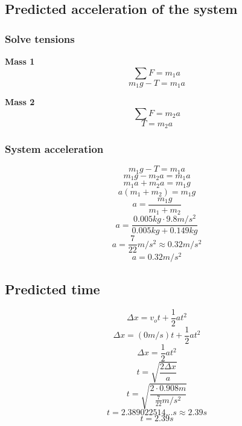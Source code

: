 \documentclass[11pt, letterpaper, includehead]{article}
\begin{document}
\subsection{Predicted acceleration of the system} %
\subsubsection{Solve tensions}
\begin{multicols}{2}
  \centering\textbf{Mass 1}
  $$\sum F = m_1 a$$
  $$m_1 g - T = m_1 a$$

  \columnbreak

  \centering\textbf{Mass 2}
  $$\sum F = m_2 a$$
  $$T = m_2a$$
\end{multicols}

\subsubsection{System acceleration}
$$m_1 g - T = m_1 a$$
$$m_1 g - m_2 a = m_1 a$$
$$m_1 a + m_2 a = m_1 g$$
$$a(m_1 + m_2) = m_1 g$$
$$a = \frac{m_1 g}{m_1 + m_2}$$
$$a = \frac{0.005kg \cdot 9.8m/s^2}{0.005kg + 0.149kg}$$
$$a = \frac{7}{22}m/s^2 \approx 0.32 m/s^2$$
$$\boxed{a =  0.32 m/s^2}$$

\subsection{Predicted time} %
$$\Delta x = v_ot + \frac{1}{2}at^2$$
$$\Delta x = (0m/s)t + \frac{1}{2}at^2$$
$$\Delta x = \frac{1}{2}at^2$$
$$t = \sqrt{\frac{2\Delta x}{a}}$$
$$t = \sqrt{\frac{2 \cdot 0.908 m}{\frac{7}{22}m/s^2}}$$
$$t = 2.389022514...s \approx 2.39s$$
$$\boxed{t = 2.39s}$$
\end{document}
